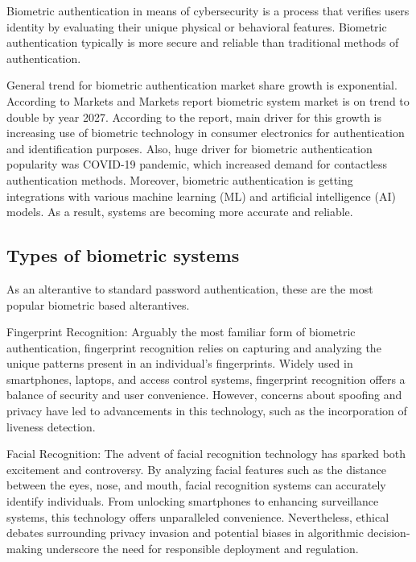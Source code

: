 \hspace{1 em} Biometric authentication in means of cybersecurity is a process that
verifies users identity by evaluating their unique physical or behavioral features. Biometric
authentication typically is more secure and reliable than traditional methods of authentication. 

General trend for biometric authentication market share growth is exponential. According
to Markets and Markets report\cite{marketsandmakets} biometric system market is on trend to 
double by year 2027. According to the report, main driver for this growth is increasing use of biometric technology in consumer electronics for authentication and identification purposes.
Also, huge driver for biometric authentication popularity was COVID-19 pandemic, 
which increased demand for contactless authentication methods. Moreover, biometric authentication
is getting integrations with various machine learning (ML) and artificial intelligence (AI)
models\cite{BRI}. As a result, systems are becoming more accurate and reliable.

\subsection{Types of biometric systems}

As an alterantive to standard password authentication, these are the most popular biometric based alterantives.

Fingerprint Recognition:
Arguably the most familiar form of biometric authentication, fingerprint recognition
 relies on capturing and analyzing the unique patterns present in an individual's 
 fingerprints. Widely used in smartphones, laptops, and access control systems,
 fingerprint recognition offers a balance of security and user convenience. 
 However, concerns about spoofing and privacy have led to advancements in this 
 technology, such as the incorporation of liveness detection.

Facial Recognition:
The advent of facial recognition technology has sparked both excitement and 
controversy. By analyzing facial features such as the distance between the eyes, 
nose, and mouth, facial recognition systems can accurately identify individuals. 
From unlocking smartphones to enhancing surveillance systems, this technology 
offers unparalleled convenience. Nevertheless, ethical debates surrounding privacy 
invasion and potential biases in algorithmic decision-making underscore the need 
for responsible deployment and regulation.

